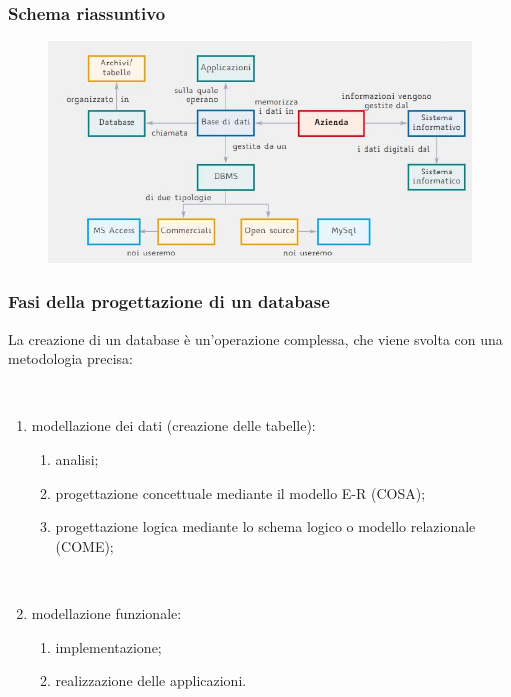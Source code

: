 \documentclass[]{beamer}
\begin{document}
\begin{frame}
\frametitle{Schema riassuntivo}
\begin{figure}
  \includegraphics[width=\columnwidth]{img/schemadb.png}
\end{figure}
\end{frame}


\begin{frame}
\frametitle{Fasi della progettazione di un database}
La creazione di un database è un'operazione complessa, che viene svolta con una metodologia precisa:

~

\begin{enumerate}
  \item modellazione dei dati (creazione delle tabelle):\pause
  \begin{enumerate}
    \item analisi;\pause
    \item progettazione concettuale mediante il modello E-R (COSA);\pause
    \item progettazione logica mediante lo schema logico o modello relazionale (COME);\pause
  \end{enumerate}

  ~

  \item modellazione funzionale:
  \begin{enumerate}
    \item implementazione;
    \item realizzazione delle applicazioni.
  \end{enumerate}
\end{enumerate}
\end{frame}
\end{document}
